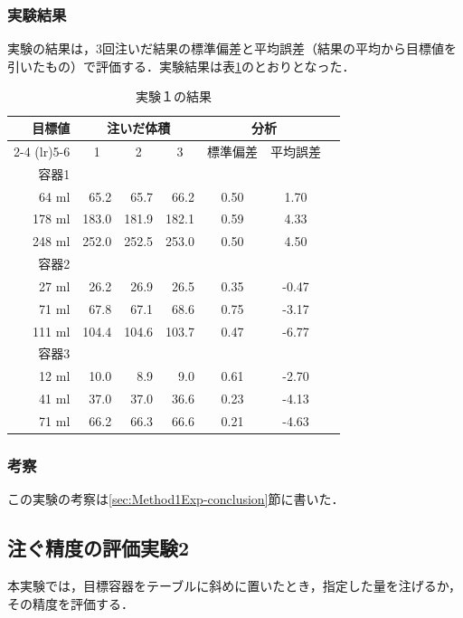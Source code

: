 		\subsubsection{実験結果}
		実験の結果は，3回注いだ結果の標準偏差と平均誤差（結果の平均から目標値を引いたもの）で評価する．実験結果は表\ref{Result1}のとおりとなった．
		\begin{table}[h]
			\centering
			\caption{実験１の結果}
			\label{Result1}
			\begin{tabular}{@{}r rrr ccc@{}}
				\toprule
				目標値& \multicolumn{3}{c}{注いだ体積}& \multicolumn{2}{c}{分析}\\
				\cmidrule(lr){2-4} \cmidrule(lr){5-6}
				& \multicolumn{1}{c}{1} & \multicolumn{1}{c}{2} & \multicolumn{1}{c}{3}  & \multicolumn{1}{c}{標準偏差} & \multicolumn{1}{c}{平均誤差}\\
				\midrule
				容器1\\
				64 ml	&	65.2	&	65.7	&	66.2	&	0.50	&	1.70	\\
				178	ml	&	183.0	&	181.9	&	182.1	&	0.59	&	4.33	\\
				248 ml	&	252.0	&	252.5	&	253.0	&	0.50	&	4.50	\\
				容器2\\
				27 ml	&	26.2	&	26.9	&	26.5	&	0.35	&	-0.47	\\
				71 ml	&	67.8	&	67.1	&	68.6	&	0.75	&	-3.17	\\
				111 ml	&	104.4	&	104.6	&	103.7	&	0.47	&	-6.77	\\
				容器3\\
				12 ml	&	10.0	&	8.9		&	9.0		&	0.61	&	-2.70	\\
				41 ml	&	37.0	&	37.0	&	36.6	&	0.23	&	-4.13	\\
				71 ml	&	66.2	&	66.3	&	66.6	&	0.21	&	-4.63	\\
				\bottomrule
			\end{tabular}
		\end{table}
		
		\subsubsection{考察}%
		この実験の考察は\ref{sec:Method1Exp-conclusion}節に書いた．
		
	\subsection{注ぐ精度の評価実験2}\label{sec:Method1Exp-2}
	本実験では，目標容器をテーブルに斜めに置いたとき，指定した量を注げるか，その精度を評価する．
	
